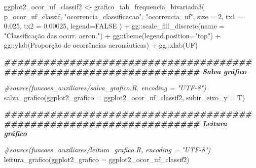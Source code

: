\documentclass[
]{article}
\newenvironment{Shaded}{\begin{snugshade}}{\end{snugshade}}
\newcommand{\AttributeTok}[1]{\textcolor[rgb]{0.77,0.63,0.00}{#1}}
\newcommand{\CommentTok}[1]{\textcolor[rgb]{0.56,0.35,0.01}{\textit{#1}}}
\newcommand{\ConstantTok}[1]{\textcolor[rgb]{0.00,0.00,0.00}{#1}}
\newcommand{\DecValTok}[1]{\textcolor[rgb]{0.00,0.00,0.81}{#1}}
\newcommand{\DocumentationTok}[1]{\textcolor[rgb]{0.56,0.35,0.01}{\textbf{\textit{#1}}}}
\newcommand{\FloatTok}[1]{\textcolor[rgb]{0.00,0.00,0.81}{#1}}
\newcommand{\FunctionTok}[1]{\textcolor[rgb]{0.00,0.00,0.00}{#1}}
\newcommand{\NormalTok}[1]{#1}
\newcommand{\OtherTok}[1]{\textcolor[rgb]{0.56,0.35,0.01}{#1}}
\newcommand{\SpecialCharTok}[1]{\textcolor[rgb]{0.00,0.00,0.00}{#1}}
\newcommand{\StringTok}[1]{\textcolor[rgb]{0.31,0.60,0.02}{#1}}
\begin{document}
\begin{Shaded}
\begin{Highlighting}[]
\NormalTok{ggplot2\_ocor\_uf\_classif2 }\OtherTok{\textless{}{-}} \FunctionTok{grafico\_tab\_frequencia\_bivariada3}\NormalTok{(}
\NormalTok{    p\_ocor\_uf\_classif,}
    \StringTok{"ocorrencia\_classificacao"}\NormalTok{,}
    \StringTok{"ocorrencia\_uf"}\NormalTok{,}
    \AttributeTok{size =} \DecValTok{2}\NormalTok{,}
    \AttributeTok{tx1 =} \FloatTok{0.025}\NormalTok{,}
    \AttributeTok{tx2 =} \FloatTok{0.00025}\NormalTok{,}
    \AttributeTok{legend=}\ConstantTok{FALSE}
\NormalTok{) }\SpecialCharTok{+}\NormalTok{ gg}\SpecialCharTok{::}\FunctionTok{scale\_fill\_discrete}\NormalTok{(}\AttributeTok{name =} \StringTok{"Classificação das ocorr. aeron."}\NormalTok{) }\SpecialCharTok{+}
\NormalTok{    gg}\SpecialCharTok{::}\FunctionTok{theme}\NormalTok{(}\AttributeTok{legend.position=}\StringTok{"top"}\NormalTok{) }\SpecialCharTok{+} 
\NormalTok{    gg}\SpecialCharTok{::}\FunctionTok{ylab}\NormalTok{(}\StringTok{\textquotesingle{}Proporção de ocorrências aeronáuticas\textquotesingle{}}\NormalTok{) }\SpecialCharTok{+}
\NormalTok{    gg}\SpecialCharTok{::}\FunctionTok{xlab}\NormalTok{(}\StringTok{\textquotesingle{}UF\textquotesingle{}}\NormalTok{)}

\DocumentationTok{\#\#\#\#\#\#\#\#\#\#\#\#\#\#\#\#\#\#\#\#\#\#\#\#\#\#\#\#\#\#\#\#\#\#\#\#\#\#\#\#\#\#\#\#\#\#\#\#\#\#\#\#\#\#\#\#\#\#\#\#\#\#\#\#\#\#\#\# Salva gráfico}

\CommentTok{\#source(\textquotesingle{}funcoes\_auxiliares/salva\_grafico.R\textquotesingle{}, encoding = "UTF{-}8")}
\FunctionTok{salva\_grafico}\NormalTok{(}\AttributeTok{ggplot2\_grafico =}\NormalTok{ ggplot2\_ocor\_uf\_classif2, }\AttributeTok{subir\_eixo\_y =}\NormalTok{ T)}

\DocumentationTok{\#\#\#\#\#\#\#\#\#\#\#\#\#\#\#\#\#\#\#\#\#\#\#\#\#\#\#\#\#\#\#\#\#\#\#\#\#\#\#\#\#\#\#\#\#\#\#\#\#\#\#\#\#\#\#\#\#\#\#\#\#\#\#\#\#\#\#\# Leitura gráfico}

\CommentTok{\#source(\textquotesingle{}funcoes\_auxiliares/leitura\_grafico.R\textquotesingle{}, encoding = "UTF{-}8")}
\FunctionTok{leitura\_grafico}\NormalTok{(}\AttributeTok{ggplot2\_grafico =}\NormalTok{ ggplot2\_ocor\_uf\_classif2)}
\end{Highlighting}
\end{Shaded}
\end{document}
